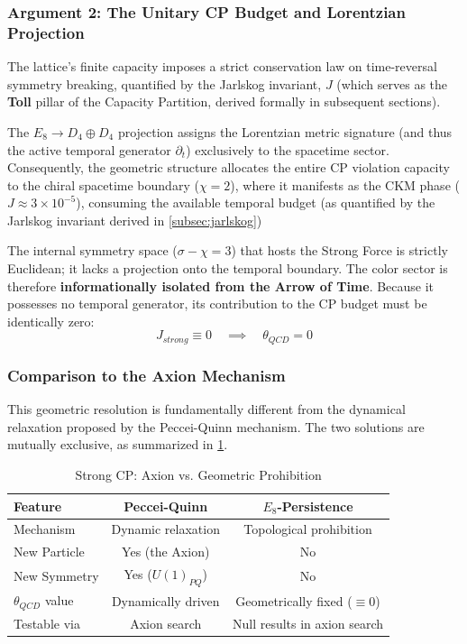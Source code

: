 \subsubsection{Argument 2: The Unitary CP Budget and Lorentzian Projection}
The lattice's finite capacity imposes a strict conservation law on time-reversal symmetry breaking, quantified by the Jarlskog invariant, $J$ (which serves as the \textbf{Toll} pillar of the Capacity Partition, derived formally in subsequent sections). 

The $E_8 \to D_4 \oplus D_4$ projection assigns the Lorentzian metric signature (and thus the active temporal generator $\partial_t$) exclusively to the spacetime sector. Consequently, the geometric structure allocates the entire CP violation capacity to the chiral spacetime boundary ($\chi=2$), where it manifests as the CKM phase ($J \approx 3 \times 10^{-5}$), consuming the available temporal budget (as quantified by the Jarlskog invariant derived in \cref{subsec:jarlskog})

The internal symmetry space ($\sigma-\chi=3$) that hosts the Strong Force is strictly Euclidean; it lacks a projection onto the temporal boundary. The color sector is therefore \textbf{informationally isolated from the Arrow of Time}. Because it possesses no temporal generator, its contribution to the CP budget must be identically zero:
\begin{equation}
    J_{strong} \equiv 0 \quad \implies \quad \theta_{QCD} = 0
\end{equation}

\subsubsection{Comparison to the Axion Mechanism}
This geometric resolution is fundamentally different from the dynamical relaxation proposed by the Peccei-Quinn mechanism. The two solutions are mutually exclusive, as summarized in \cref{tab:cp_solutions}.

\begin{table}[htbp]
\centering
\caption{Strong CP: Axion vs. Geometric Prohibition}
\begin{tabular}{@{}lcc@{}}
\toprule
\textbf{Feature} & \textbf{Peccei-Quinn} & \textbf{$E_8$-Persistence} \\
\midrule
Mechanism & Dynamic relaxation & Topological prohibition \\
New Particle & Yes (the Axion) & No \\
New Symmetry & Yes ($U(1)_{PQ}$) & No \\
$\theta_{QCD}$ value & Dynamically driven & Geometrically fixed ($\equiv 0$) \\
Testable via & Axion search & Null results in axion search \\
\bottomrule
\end{tabular}
\label{tab:cp_solutions}
\end{table}

